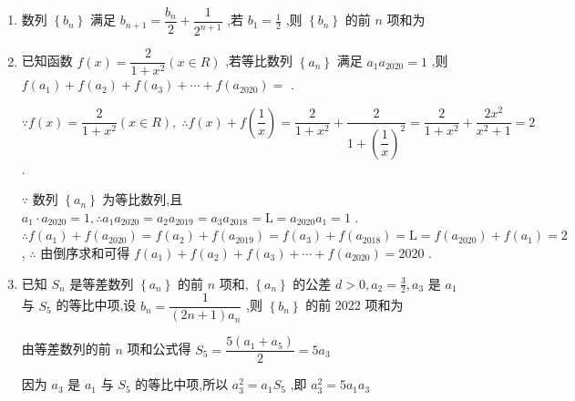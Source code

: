 \begin{enumerate}
    \item 数列 $ \left\{  {b}_{n}\right\} $ 满足 $ {b}_{n + 1} = \dfrac{{b}_{n}}{2} + \dfrac{1}{{2}^{n + 1}} $ ,若 $ {b}_{1} = \frac{1}{2} $ ,则 $ \left\{  {b}_{n}\right\} $ 的前 $ n $ 项和为 

    \item 已知函数 $ f\left( x\right)  = \dfrac{2}{1 + {x}^{2}}\left( {x \in  R}\right) $ ,若等比数列 $ \left\{  {a}_{n}\right\} $ 满足 $ {a}_{1}{a}_{2020} = 1 $ ,则
    $ f\left( {a}_{1}\right)  + f\left( {a}_{2}\right)  + f\left( {a}_{3}\right)  + \cdots + f\left( {a}_{2020}\right)  = $ .
    \begin{jieda}
        $ \because f\left( x\right)  = \dfrac{2}{1 + {x}^{2}}\left( {x \in  R}\right) ,\;\therefore f\left( x\right)  + f\left( \dfrac{1}{x}\right)  = \dfrac{2}{1 + {x}^{2}} + \dfrac{2}{1 + {\left( \dfrac{1}{x}\right) }^{2}} = \dfrac{2}{1 + {x}^{2}} + \dfrac{2{x}^{2}}{{x}^{2} + 1} = 2 $ .
        
        $ \because $ 数列 $ \left\{  {a}_{n}\right\} $ 为等比数列,且 $ {a}_{1} \cdot  {a}_{2020} = 1,\therefore {a}_{1}{a}_{2020} = {a}_{2}{a}_{2019} = {a}_{3}{a}_{2018} = \mathrm{L} = {a}_{2020}{a}_{1} = 1 $ .
        $ \therefore f\left( {a}_{1}\right)  + f\left( {a}_{2020}\right)  = f\left( {a}_{2}\right)  + f\left( {a}_{2019}\right)  = f\left( {a}_{3}\right)  + f\left( {a}_{2018}\right)  = \mathrm{L} = f\left( {a}_{2020}\right)  + f\left( {a}_{1}\right)  = 2 $ ,
        $ \therefore $ 由倒序求和可得 $ f\left( {a}_{1}\right)  + f\left( {a}_{2}\right)  + f\left( {a}_{3}\right)  + \cdots + f\left( {a}_{2020}\right)  = {2020} $ .
    \end{jieda}

    
    \item 已知 $ {S}_{n} $ 是等差数列 $ \left\{  {a}_{n}\right\} $ 的前 $ n $ 项和, $ \left\{  {a}_{n}\right\} $ 的公差 $ d > 0,{a}_{2} = \frac{3}{2},{a}_{3} $ 是 $ {a}_{1} $ 与 $ {S}_{5} $ 的等比中项,设
    $ {b}_{n} = \dfrac{1}{\left( {{2n} + 1}\right) {a}_{n}} $ ,则 $ \left\{  {b}_{n}\right\} $ 的前 2022 项和为
    
    \begin{jieda}
        由等差数列的前 $ n $ 项和公式得 $ {S}_{5} = \dfrac{5\left( {{a}_{1} + {a}_{5}}\right) }{2} = 5{a}_{3} $ 
        
        因为 $ {a}_{3} $ 是 $ {a}_{1} $ 与 $ {S}_{5} $ 的等比中项,所以 $ {a}_{3}^{2} = {a}_{1}{S}_{5} $ ,即 $ {a}_{3}^{2} = 5{a}_{1}{a}_{3} $ 
        

\end{jieda}
\end{enumerate}
